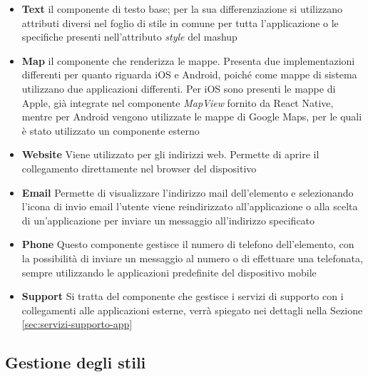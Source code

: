 	\begin{itemize}
		\item \textbf{Text} \upe il componente di testo base; per la sua differenziazione si utilizzano attributi diversi nel foglio di stile in comune per tutta l'applicazione o le specifiche presenti nell'attributo \emph{style} del mashup
		\item \textbf{Map} \upe il componente che renderizza le mappe. Presenta due implementazioni differenti per quanto riguarda iOS e Android, poiché come mappe di sistema utilizzano due applicazioni differenti. Per iOS sono presenti le mappe di Apple, già integrate nel componente \emph{MapView} fornito da React Native, mentre per Android vengono utilizzate le mappe di Google Maps, per le quali è stato utilizzato un componente esterno
		\item \textbf{Website} Viene utilizzato per gli indirizzi web. Permette di aprire il collegamento direttamente nel browser del dispositivo
		\item \textbf{Email} Permette di visualizzare l'indirizzo mail dell'elemento e selezionando l'icona di invio email l'utente viene reindirizzato all'applicazione o alla scelta di un'applicazione per inviare un messaggio all'indirizzo specificato
		\item \textbf{Phone} Questo componente gestisce il numero di telefono dell'elemento, con la possibilità di inviare un messaggio al numero o di effettuare una telefonata, sempre utilizzando le applicazioni predefinite del dispositivo mobile
		\item \textbf{Support} Si tratta del componente che gestisce i servizi di supporto con i collegamenti alle applicazioni esterne, verrà spiegato nei dettagli nella Sezione \ref{sec:servizi-supporto-app}
	\end{itemize}

\subsection{Gestione degli stili}

